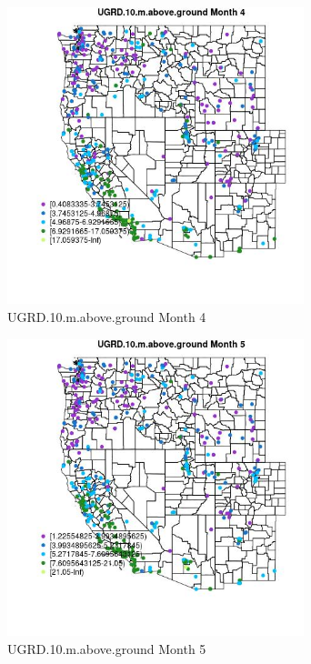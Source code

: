 \begin{figure} 
\centering  
\includegraphics[width=0.77\textwidth]{Code_Outputs/ML_input_report_ML_input_PM25_Step5_part_d_de_duplicated_aves_ML_input_MapObsMo4UGRD10maboveground.jpg} 
\caption{\label{fig:ML_input_report_ML_input_PM25_Step5_part_d_de_duplicated_aves_ML_inputMapObsMo4UGRD10maboveground}UGRD.10.m.above.ground Month 4} 
\end{figure} 
 

\begin{figure} 
\centering  
\includegraphics[width=0.77\textwidth]{Code_Outputs/ML_input_report_ML_input_PM25_Step5_part_d_de_duplicated_aves_ML_input_MapObsMo5UGRD10maboveground.jpg} 
\caption{\label{fig:ML_input_report_ML_input_PM25_Step5_part_d_de_duplicated_aves_ML_inputMapObsMo5UGRD10maboveground}UGRD.10.m.above.ground Month 5} 
\end{figure} 
 

